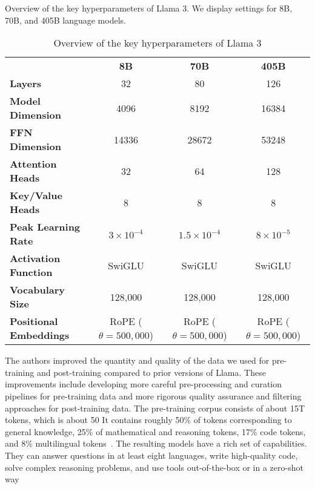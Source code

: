 \begin{table}[h!]
	\centering
	\caption{Overview of the key hyperparameters of Llama 3. We display settings for 8B, 70B, and 405B language models.}
	\begin{tabularx}{\textwidth}{Xccc}
		\textbf{}                      & \textbf{8B}               & \textbf{70B}              & \textbf{405B}             \\
		\textbf{Layers}                & 32                        & 80                        & 126                       \\
		\textbf{Model Dimension}       & 4096                      & 8192                      & 16384                     \\
		\textbf{FFN Dimension}         & 14336                     & 28672                     & 53248                     \\
		\textbf{Attention Heads}       & 32                        & 64                        & 128                       \\
		\textbf{Key/Value Heads}       & 8                         & 8                         & 8                         \\
		\textbf{Peak Learning Rate}    & $3 \times 10^{-4}$        & $1.5 \times 10^{-4}$      & $8 \times 10^{-5}$        \\
		\textbf{Activation Function}   & SwiGLU                    & SwiGLU                    & SwiGLU                    \\
		\textbf{Vocabulary Size}       & 128,000                   & 128,000                   & 128,000                   \\
		\textbf{Positional Embeddings} & RoPE ($\theta = 500,000$) & RoPE ($\theta = 500,000$) & RoPE ($\theta = 500,000$) \\
		\hline
	\end{tabularx}
	\caption{Overview of the key hyperparameters of Llama 3}
	\label{tab:llama3-hyperparameters}
\end{table}

The authors improved the quantity and quality of the data we used for pre-training and post-training compared to prior versions of Llama.
These improvements include developing more careful pre-processing and curation pipelines for pre-training data and more rigorous quality assurance and filtering approaches for post-training data.
The pre-training corpus consists of about 15T tokens, which is about 50%
It contains roughly 50\% of tokens corresponding to general knowledge, 25\% of mathematical and reasoning tokens, 17\% code tokens, and 8\% multilingual tokens~\cite{llama3}.
The resulting models have a rich set of capabilities.
They can answer questions in at least eight languages, write high-quality code, solve complex reasoning problems, and use tools out-of-the-box or in a zero-shot way


